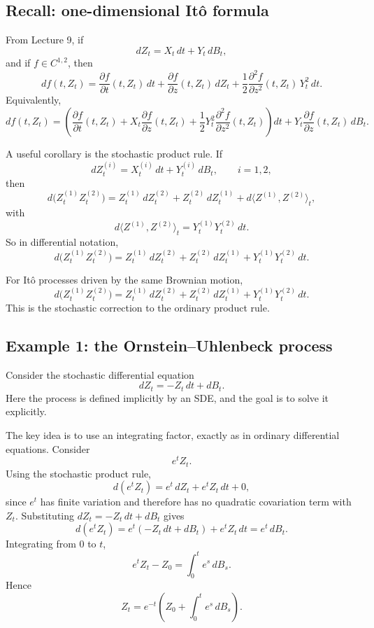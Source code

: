\documentclass[11pt]{article}
\theoremstyle{definition}
\begin{document}
\subsection{Recall: one-dimensional It\^o formula}

From Lecture 9, if
\[
dZ_t=X_t\,dt+Y_t\,dB_t,
\]
and if $f\in C^{1,2}$, then
\[
df(t,Z_t)
=
\frac{\partial f}{\partial t}(t,Z_t)\,dt
+
\frac{\partial f}{\partial z}(t,Z_t)\,dZ_t
+
\frac12
\frac{\partial^2 f}{\partial z^2}(t,Z_t)\,Y_t^2\,dt.
\]
Equivalently,
\[
df(t,Z_t)
=
\left(
\frac{\partial f}{\partial t}(t,Z_t)
+
X_t\frac{\partial f}{\partial z}(t,Z_t)
+
\frac12 Y_t^2\frac{\partial^2 f}{\partial z^2}(t,Z_t)
\right)dt
+
Y_t\frac{\partial f}{\partial z}(t,Z_t)\,dB_t.
\]

A useful corollary is the stochastic product rule. If
\[
dZ_t^{(i)}=X_t^{(i)}\,dt+Y_t^{(i)}\,dB_t,
\qquad i=1,2,
\]
then
\[
d\bigl(Z_t^{(1)}Z_t^{(2)}\bigr)
=
Z_t^{(1)}\,dZ_t^{(2)}+Z_t^{(2)}\,dZ_t^{(1)}+d\langle Z^{(1)},Z^{(2)}\rangle_t,
\]
with
\[
d\langle Z^{(1)},Z^{(2)}\rangle_t=Y_t^{(1)}Y_t^{(2)}\,dt.
\]
So in differential notation,
\[
d\bigl(Z_t^{(1)}Z_t^{(2)}\bigr)
=
Z_t^{(1)}\,dZ_t^{(2)}+Z_t^{(2)}\,dZ_t^{(1)}+Y_t^{(1)}Y_t^{(2)}\,dt.
\]

\begin{keyformula}
For It\^o processes driven by the same Brownian motion,
\[
d\bigl(Z_t^{(1)}Z_t^{(2)}\bigr)
=
Z_t^{(1)}\,dZ_t^{(2)}+Z_t^{(2)}\,dZ_t^{(1)}+Y_t^{(1)}Y_t^{(2)}\,dt.
\]
This is the stochastic correction to the ordinary product rule.
\end{keyformula}

\subsection{Example 1: the Ornstein--Uhlenbeck process}

Consider the stochastic differential equation
\[
dZ_t=-Z_t\,dt+dB_t.
\]
Here the process is defined implicitly by an SDE, and the goal is to solve it explicitly.

The key idea is to use an integrating factor, exactly as in ordinary differential equations. Consider
\[
e^t Z_t.
\]
Using the stochastic product rule,
\[
d(e^t Z_t)=e^t\,dZ_t+e^t Z_t\,dt+0,
\]
since $e^t$ has finite variation and therefore has no quadratic covariation term with $Z_t$.
Substituting $dZ_t=-Z_t\,dt+dB_t$ gives
\[
d(e^t Z_t)=e^t(-Z_t\,dt+dB_t)+e^t Z_t\,dt=e^t\,dB_t.
\]
Integrating from $0$ to $t$,
\[
e^t Z_t-Z_0=\int_0^t e^s\,dB_s.
\]
Hence
\[
Z_t=e^{-t}\left(Z_0+\int_0^t e^s\,dB_s\right).
\]
\end{document}
